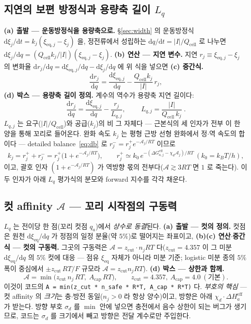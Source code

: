 \documentclass[11pt,a4paper]{article}
\newcommand{\dd}{\mathrm{d}}
\newcommand{\eff}{\mathrm{eff}}
\newcommand{\eq}{\mathrm{eq}}
\newcommand{\cell}{\mathrm{cell}}
\newcommand{\code}[1]{\texttt{#1}}
\begin{document}
\subsection{지연의 보편 방정식과 용량축 길이 $L_q$}
\textbf{(a) 출발 — 운동방정식을 용량축으로.} \S\ref{sec:width} 의 운동방정식 $\dd\xi_j/\dd t=k_j(\xi_{\eq,j}-\xi_j)$
을, 정전류에서 성립하는 $\dd q/\dd t=|I|/Q_\cell$ 로 나누면 $\dd\xi_j/\dd q=(Q_\cell k_j/|I|)(\xi_{\eq,j}-\xi_j)$.
\textbf{(b) 연산 — 지연 변수.} 지연 $r_j\equiv\xi_{\eq,j}-\xi_j$ 의 변화율 $\dd r_j/\dd q=\dd\xi_{\eq,j}/\dd q-\dd\xi_j/\dd q$
에 위 식을 넣으면 \textbf{(c) 중간식.}
\begin{equation}
\frac{\dd r_j}{\dd q}=\frac{\dd\xi_{\eq,j}}{\dd q}-\frac{Q_\cell k_j}{|I|}\,r_j,
\label{eq:Lqmid}
\end{equation}
\textbf{(d) 박스 — 용량축 길이 정의.} 계수의 역수가 용량축 지연 길이다:
\begin{equation}
\frac{\dd r_j}{\dd q}=\frac{\dd\xi_{\eq,j}}{\dd q}-\frac{r_j}{L_{q,j}},
\qquad \boxed{\;L_{q,j}=\frac{|I|}{Q_\cell\,k_j}\;.}
\label{eq:Lq}
\end{equation}
$L_{q,j}$ 는 요구($|I|/Q_\cell$)와 공급($k_j$)의 비 그 자체다 — 근본식의 세 인자가 전부 이 한 양을 통해 꼬리로
들어온다. 완화 속도 $k_j$ 는 평형 근방 선형 완화에서 정$\cdot$역 속도의 합이다 — detailed balance~\eqref{eq:db} 로
$r_j^-=r_j^+e^{-\mathcal A_j/RT}$ 이므로
\begin{equation}
k_j=r_j^++r_j^-=r_j^+\big(1+e^{-\mathcal A_j/RT}\big),
\qquad r_j^+\simeq k_0\,e^{-(\Delta G_{a,j}^\eff-\chi_d\mathcal A_j)/RT}\ (k_0=k_BT/h),
\label{eq:kuniv}
\end{equation}
이고, 괄호 인자 $(1+e^{-\mathcal A_j/RT})$ 가 역방향 몫의 전부다($\mathcal A\gtrsim3RT$ 면 $1$ 로 죽는다). 이 두 인자가
아래 $L_q$ 평가식의 분모와 forward 지수를 각각 채운다.

\subsection{컷 affinity $\mathcal A$ — 꼬리 시작점의 구동력}
$L_q$ 는 전이당 한 점(꼬리 컷점 $q_a$)에서 \emph{상수로 동결}된다. \textbf{(a) 출발 — 컷의 정의.} 컷점은 원천
$\dd\xi_\eq/\dd q$ 가 정점의 일정 분율(약 $5\%$)로 떨어지는 좌표이고, \textbf{(b)(c) 연산$\cdot$중간식 — 컷의 구동력.}
그곳의 구동력은 $\mathcal A=z_\mathrm{cut}\cdot n_jRT$ 다($z_\mathrm{cut}=4.357$ 이 그 미분 $\dd\xi_\eq/\dd q$ 의 $5\%$
컷에 대응 — 점유 $\xi_\eq$ 자체가 아니라 미분 기준; logistic 미분 종의 $5\%$ 폭이 중심에서 $\pm z_\mathrm{cut}\,RT/F$
규모라 $\mathcal A=z_\mathrm{cut}n_jRT$). \textbf{(d) 박스 — 상한과 함께.}
\begin{equation}
\mathcal A=\min\!\big(z_\mathrm{cut}\,n_j\,RT,\;A_\mathrm{cap}\,RT\big),
\qquad z_\mathrm{cut}=4.357,\ A_\mathrm{cap}=4.0\ (\text{기본}).
\label{eq:Acut}
\end{equation}
이것이 코드의 \code{A = min(z\_cut * n\_safe * R*T, A\_cap * R*T)} 다. \emph{부호의 핵심} — 컷 affinity 의 \emph{크기}는
충$\cdot$방전 동일($n_j>0$ 라 항상 양수)이고, 방향은 아래 $\chi_d\cdot\Delta H_a^\eff$ 가 받는다. 방향 부호 $\sigma_d$ 를
$\min$ 안에 넣으면 충전에서 음수 상한이 되는 버그가 생기므로, 코드는 $\sigma_d$ 를 크기에서 빼고 방향은 전달 계수로만
주입한다.
\end{document}

